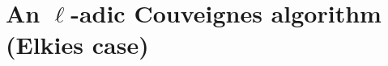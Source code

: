\documentclass[10pt,a4paper]{beamer}
\theoremstyle{plain}
\theoremstyle{definition}
\theoremstyle{definition}
\theoremstyle{definition}
\theoremstyle{definition}
\theoremstyle{remark}
\theoremstyle{remark}
\begin{document}



\section{An $\ell$-adic Couveignes algorithm (Elkies case)}
\end{document}
